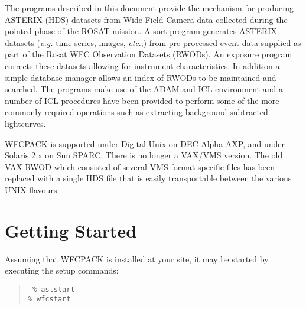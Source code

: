 
The programs described in this document provide the mechanism for
producing ASTERIX (HDS) datasets from Wide Field Camera data collected
during the pointed phase of the ROSAT mission. A sort program generates
ASTERIX datasets ({\em e.g.\/} time series, images, {\em etc}.,) from
pre-processed event data supplied as part of the Rosat WFC Observation
Datasets (RWODs). An exposure program corrects these datasets allowing
for instrument characteristics. In addition a simple database manager
allows an index of RWODs to be maintained and searched.  The programs
make use of the ADAM and ICL environment and a number of ICL procedures
have been provided to perform some of the more commonly required
operations such as extracting background subtracted lightcurves.

WFCPACK is supported under Digital Unix on DEC Alpha AXP, and under
Solaris 2.x on Sun SPARC.  There is no longer a VAX/VMS version.  The
old VAX RWOD which consisted of several VMS format specific files has
been replaced with a single HDS file that is easily transportable
between the various UNIX flavours.

 \newpage
 \begin{latexonly}
   \setlength{\parskip}{0mm}
   \latexonlytoc
   \setlength{\parskip}{\medskipamount}
   \markright{\stardocname}
 \end{latexonly}
\newpage
\renewcommand{\thepage}{\arabic{page}}
\setcounter{page}{1}

\section{Getting Started}
\label{sec:staring}

Assuming that WFCPACK is installed at your site, it may be started 
by executing the setup commands:

\begin{quote} {\tt
\% aststart \\
\% wfcstart}
\end{quote}

